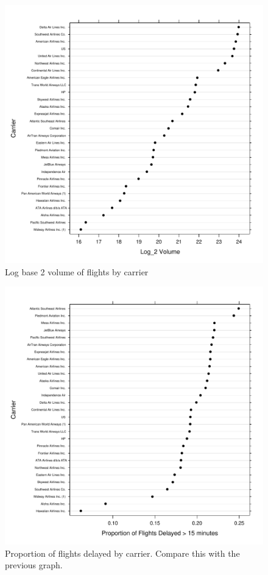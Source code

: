 \documentclass[letterpaper,10pt,english]{sphinxmanual}
\begin{document}
\begin{figure}[htbp]
\centering

\includegraphics{carrvol.pdf}
\caption{Log base 2 volume of flights by carrier}\end{figure}
\begin{figure}[htbp]
\centering

\includegraphics{carrdelay.pdf}
\caption{Proportion of flights delayed by carrier. Compare this with the previous graph.}\end{figure}
\end{document}
